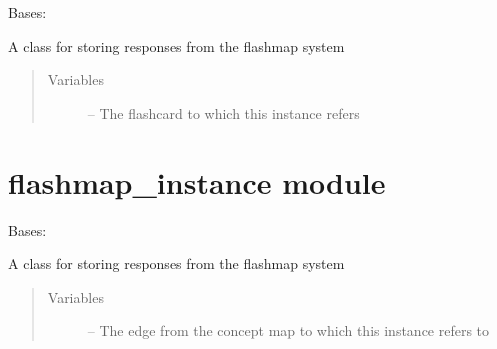 \documentclass[letterpaper,10pt,english]{sphinxmanual}
\begin{document}
\begin{fulllineitems}
\label{\detokenize{flashcard_instance:flashcard_instance.FlashcardInstance}}
Bases: {\hyperref[\detokenize{instance:instance.Instance}]{}}

A class for storing responses from the flashmap system
\begin{quote}\begin{description}
\item[{Variables}] \leavevmode
{} -- The flashcard to which this instance refers

\end{description}\end{quote}

\end{fulllineitems}



\chapter{flashmap\_instance module}
\label{\detokenize{flashmap_instance:flashmap-instance-module}}\label{\detokenize{flashmap_instance::doc}}\label{\detokenize{flashmap_instance:module-flashmap_instance}}

\begin{fulllineitems}
\label{\detokenize{flashmap_instance:flashmap_instance.FlashmapInstance}}
Bases: {\hyperref[\detokenize{instance:instance.Instance}]{}}

A class for storing responses from the flashmap system
\begin{quote}\begin{description}
\item[{Variables}] \leavevmode
{} -- The edge from the concept map to which this instance refers to

\end{description}\end{quote}

\end{fulllineitems}
\end{document}
